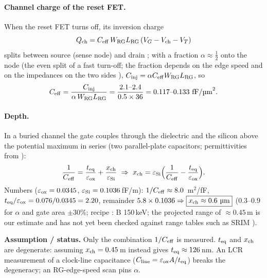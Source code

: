 \documentclass[10pt,a4paper]{article}
\newcommand{\caveat}[1]{\par\smallskip\noindent\colorbox{orange!10}{\parbox{\dimexpr\linewidth-2\fboxsep}{\small\textbf{Assumption / status.} #1}}\par\smallskip}
\begin{document}
\paragraph{Channel charge of the reset FET.} When the reset FET turns off, its inversion charge
\begin{equation}
Q_{\rm ch}=C_{\rm eff}\,W_{\rm RG}L_{\rm RG}\,(V_G-V_{\rm ch}-V_T)
\end{equation}
splits between source (sense node) and drain \cite{sheu1984,wegmann1987}; with a fraction $\alpha\approx\tfrac12$
onto the node (the even split of a fast turn-off; the fraction depends on the edge speed and on the impedances on the two
sides \cite{wegmann1987}),
$C_{\rm inj}=\alpha C_{\rm eff}W_{\rm RG}L_{\rm RG}$, so
\begin{equation}
C_{\rm eff}=\frac{C_{\rm inj}}{\alpha\,W_{\rm RG}L_{\rm RG}}=\frac{2.1\text{--}2.4}{0.5\times36}=0.117\text{--}0.133\ \text{fF/\textmu m}^2 .
\end{equation}

\paragraph{Depth.} In a buried channel the gate couples through the dielectric and the silicon above the potential
maximum in series (two parallel-plate capacitors; permittivities from \cite{sze}):
\begin{equation}
\frac1{C_{\rm eff}}=\frac{t_{\rm eq}}{\varepsilon_{\rm ox}}+\frac{x_{\rm ch}}{\varepsilon_{\rm Si}}
\ \Rightarrow\
x_{\rm ch}=\varepsilon_{\rm Si}\Big(\frac1{C_{\rm eff}}-\frac{t_{\rm eq}}{\varepsilon_{\rm ox}}\Big).
\end{equation}
Numbers ($\varepsilon_{\rm ox}=0.0345$, $\varepsilon_{\rm Si}=0.1036$\,fF/\textmu m): $1/C_{\rm eff}\approx8.0$\,\textmu
m$^2$/fF, $t_{\rm eq}/\varepsilon_{\rm ox}=0.076/0.0345=2.20$, remainder $5.8\times0.1036\Rightarrow
\boxed{x_{\rm ch}\approx0.6\ \text{\textmu m}}$ (0.3--0.9 for $\alpha$ and gate area $\pm30\%$; recipe \cite{recipe}: B 150\,keV;
the projected range of $\approx0.45$\,\textmu m is our estimate and has not yet been checked against range tables such
as SRIM \cite{srim2010}).
\caveat{Only the combination $1/C_{\rm eff}$ is measured. $t_{\rm eq}$ and $x_{\rm ch}$ are degenerate: assuming
$x_{\rm ch}=0.45$\,\textmu m instead gives $t_{\rm eq}\approx126$\,nm. An LCR measurement of a clock-line capacitance
($C_{\rm line}=\varepsilon_{\rm ox}A/t_{\rm eq}$) breaks the degeneracy; an RG-edge-speed scan pins $\alpha$.}
\end{document}
